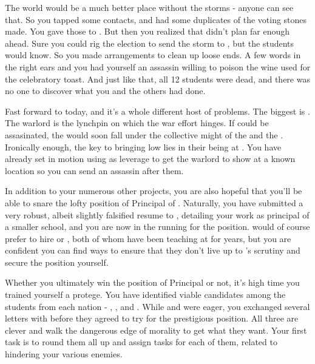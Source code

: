 \documentclass[char]{GL2020}
\begin{document}
The world would be a much better place without the storms - anyone can see that. So you tapped some contacts, and had some duplicates of the voting stones made. You gave those to \cHeadScientist{}. But then you realized that \cDiplomat{} didn’t plan far enough ahead. Sure you could rig the election to send the storm to \pShip{}, but the students would know. So you made arrangements to clean up loose ends. A few words in the right ears and you had yourself an assassin willing to poison the wine used for the celebratory toast. And just like that, all 12 students were dead, and there was no one to discover what you and the others had done.

Fast forward to today, and it's a whole different host of problems. The biggest is \cLoud{\full}. The warlord is the lynchpin on which the \pShip{} war effort hinges. If \cLoud{\they} could be assasinated, the \pShip{} would soon fall under the collective might of the \pFarm{} and the \pTech{}. Ironically enough, the key to bringing \cLoud{} low lies in their \cWarlordDaughter{\child} being at \pSchool{}. You have already set in motion using \cWarlordDaughter{\them} as leverage to get the warlord to show \cLoud{\themself} at a known location so you can send an assassin after them.

In addition to your numerous other projects, you are also hopeful that you’ll be able to snare the lofty position of Principal of \pSchool{}.  Naturally, you have submitted a very robust, albeit slightly falsified resume to \cPrincipal{}, detailing your work as principal of a smaller school, and you are now in the running for the position.  \cPrincipal{} would of course prefer to hire \cMusic{} or \cBeetle{}, both of whom have been teaching at \pSc{} for years, but you are confident you can find ways to ensure that they don’t live up to \cPrincipal{}’s scrutiny and secure the position yourself.

Whether you ultimately win the position of Principal or not, it’s high time you trained yourself a protege. You have identified viable candidates among the students from each nation - \cPirateChild{}, \cLibAssist{}, and \cAmbition{}.  While \cLibAssist{} and \cAmbition{} were eager, you exchanged several letters with \cPirateChild{} before they agreed to try for the prestigious position.  All three are clever and walk the dangerous edge of morality to get what they want. Your first task is to round them all up and assign tasks for each of them, related to hindering your various enemies.
\end{document}
